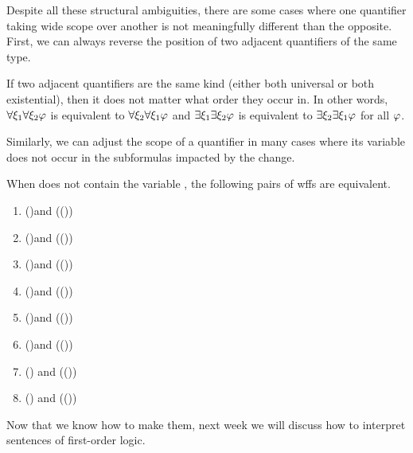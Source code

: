 
Despite all these structural ambiguities, there are some cases where one
quantifier taking wide scope over another is not meaningfully different than
the opposite. First, we can always reverse the position of two adjacent
quantifiers of the same type.

\begin{observation}
  \label{obs:adjacent-quantifiers}
  If two adjacent quantifiers are the same kind (either both universal or both
  existential), then it does not matter what order they occur in. In other
  words, $\forall\xi_1\forall\xi_2\varphi$ is equivalent to
  $\forall\xi_2\forall\xi_1\varphi$ and
  $\exists\xi_1\exists\xi_2\varphi$ is equivalent to
  $\exists\xi_2\exists\xi_1\varphi$ for all $\varphi$.
\end{observation}

Similarly, we can adjust the scope of a quantifier in many cases where its
variable does not occur in the subformulas impacted by the change.

\begin{observation}
  \label{obs:moving-quantifiers}
  When \epsi does not contain the variable \exi, the following pairs of wffs
  are equivalent.
  \begin{enumerate}
  \item \eforall\exi\ephi(\exi)\eand\epsi and
    \eforall\exi(\ephi(\exi)\eand\epsi)
  \item \eexists\exi\ephi(\exi)\eand\epsi and
    \eexists\exi(\ephi(\exi)\eand\epsi)
  \item \eforall\exi\ephi(\exi)\eor\epsi and
    \eforall\exi(\ephi(\exi)\eor\epsi)
  \item \eexists\exi\ephi(\exi)\eor\epsi and
    \eexists\exi(\ephi(\exi)\eor\epsi)
  \item \eforall\exi\ephi(\exi)\eif\epsi and
    \eexists\exi(\ephi(\exi)\eif\epsi)
  \item \eexists\exi\ephi(\exi)\eif\epsi and
    \eforall\exi(\ephi(\exi)\eif\epsi)
  \item \epsi\eif\eforall\exi\ephi(\exi) and
    \eforall\exi(\epsi\eif\ephi(\exi))
  \item \epsi\eif\eexists\exi\ephi(\exi) and
    \eexists\exi(\epsi\eif\ephi(\exi))
  \end{enumerate}
\end{observation}

Now that we know how to make them, next week we will discuss how to interpret
sentences of first-order logic.
